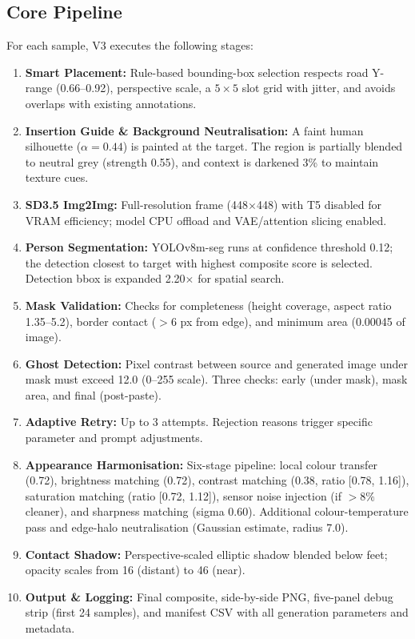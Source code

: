 \documentclass[12pt,a4paper]{article}
\begin{document}
\subsection{Core Pipeline}
For each sample, V3 executes the following stages:

\begin{enumerate}
    \item \textbf{Smart Placement:} Rule-based bounding-box selection respects road Y-range (0.66--0.92), perspective scale, a $5 \times 5$ slot grid with jitter, and avoids overlaps with existing annotations.

    \item \textbf{Insertion Guide \& Background Neutralisation:} A faint human silhouette ($\alpha=0.44$) is painted at the target. The region is partially blended to neutral grey (strength 0.55), and context is darkened 3\% to maintain texture cues.

    \item \textbf{SD3.5 Img2Img:} Full-resolution frame (448$\times$448) with T5 disabled for VRAM efficiency; model CPU offload and VAE/attention slicing enabled.

    \item \textbf{Person Segmentation:} YOLOv8m-seg runs at confidence threshold 0.12; the detection closest to target with highest composite score is selected. Detection bbox is expanded 2.20$\times$ for spatial search.

    \item \textbf{Mask Validation:} Checks for completeness (height coverage, aspect ratio 1.35--5.2), border contact ($> 6$ px from edge), and minimum area (0.00045 of image).

    \item \textbf{Ghost Detection:} Pixel contrast between source and generated image under mask must exceed 12.0 (0--255 scale). Three checks: early (under mask), mask area, and final (post-paste).

    \item \textbf{Adaptive Retry:} Up to 3 attempts. Rejection reasons trigger specific parameter and prompt adjustments.

    \item \textbf{Appearance Harmonisation:} Six-stage pipeline: local colour transfer (0.72), brightness matching (0.72), contrast matching (0.38, ratio [0.78, 1.16]), saturation matching (ratio [0.72, 1.12]), sensor noise injection (if $>8\%$ cleaner), and sharpness matching (sigma 0.60). Additional colour-temperature pass and edge-halo neutralisation (Gaussian estimate, radius 7.0).

    \item \textbf{Contact Shadow:} Perspective-scaled elliptic shadow blended below feet; opacity scales from 16 (distant) to 46 (near).

    \item \textbf{Output \& Logging:} Final composite, side-by-side PNG, five-panel debug strip (first 24 samples), and manifest CSV with all generation parameters and metadata.
\end{enumerate}
\end{document}
